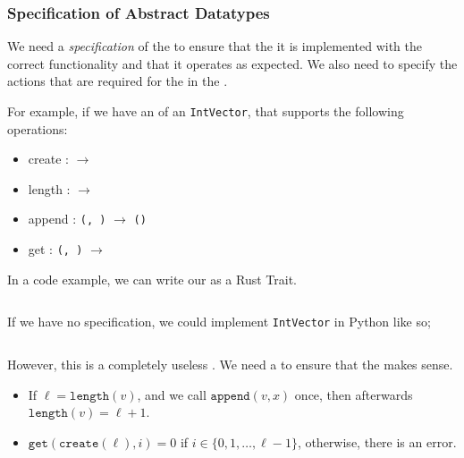 \subsubsection{Specification of Abstract Datatypes}\label{subsubsec:Specification_Abstract_Datatype}
\begin{definition}[Specification]\label{def:ADT_Specification}
  We need a \emph{specification} of the  to ensure that the it is implemented with the correct functionality and that it operates as expected.
  We also need to specify the actions that are required for the  in the .
\end{definition}

For example, if we have an  of an \texttt{IntVector}, that supports the following operations:
\begin{itemize}[noitemsep]
\item create : \texttt{} $\rightarrow$ \texttt{}
\item length : \texttt{} $\rightarrow$ \texttt{}
\item append : \texttt{(, )} $\rightarrow$ \texttt{()}
\item get : \texttt{(, )} $\rightarrow$ \texttt{}
\end{itemize}

In a code example, we can write our  as a Rust Trait.
\inputminted[frame=lines,linenos]{rust}{./EDAP05-Concepts_Programming_Languages-Sections/Abstract_Data_Types/Code/IntVector_Interface.rs}

If we have no specification, we could implement \texttt{IntVector} in Python like so;
\inputminted[frame=lines,linenos]{python3}{./EDAP05-Concepts_Programming_Languages-Sections/Abstract_Data_Types/Code/IntVector_No_Spec.py}

However, this is a completely useless .
We need a  to ensure that the  makes sense.
\begin{itemize}[noitemsep]
\item If $\ell = \mathtt{length}(v)$, and we call $\mathtt{append}(v, x)$ once, then afterwards $\mathtt{length}(v) = \ell + 1$.
\item $\mathtt{get}(\mathtt{create}(\ell), i) = 0$ if $i \in \lbrace 0, 1, \ldots, \ell-1 \rbrace$, otherwise, there is an error.
\end{itemize}

